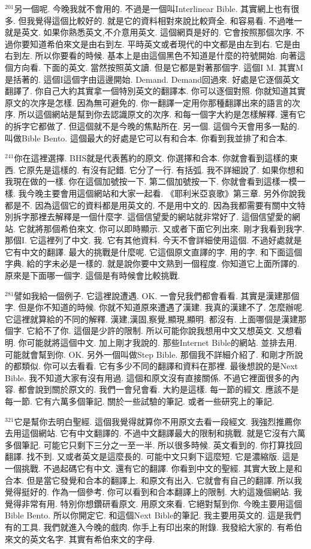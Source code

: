 \documentclass{book}
\begin{document}
$^{201}$另一個呢.
今晚我就不會用的.
不過是一個叫Interlinear Bible.
其實網上也有很多.
但我覺得這個比較好的.
就是它的資料相對來說比較齊全.
和容易看.
不過唯一就是英文.
如果你熟悉英文,不介意用英文.
這個網頁是好的.
它會按照那個次序.
不過你要知道希伯來文是由右到左.
平時英文或者現代的中文都是由左到右.
它是由右到左.
所以你要看的時候.
基本上是由這個黑色不知道是什麼的符號開始.
向著這個方向看.
下面的英文.
當然按照英文讀.
但是它都是對著那個字.
這個I M.
其實M是括著的.
這個I這個字由這邊開始.
Demand.
Demand回過來.
好處是它逐個英文翻譯了.
你自己大約其實拿一個特別英文的翻譯本.
你可以逐個對照.
你就知道其實原文的次序是怎樣.
因為無可避免的.
你一翻譯一定用你那種翻譯出來的語言的次序.
所以這個網站是幫到你去認識原文的次序.
和每一個字大約是怎樣解釋.
還有它的拆字它都做了.
但這個就不是今晚的焦點所在.
另一個.
這個今天會用多一點的.
叫做Bible Bento.
這個最大的好處是它可以有和合本.
你看到我並排了和合本.

$^{241}$你在這裡選擇.
BHS就是代表舊約的原文.
你選擇和合本.
你就會看到這樣的東西.
它原先是這樣的.
有沒有記錯.
它分了一行.
有括弧.
我不詳細說了.
如果你想和我現在做的一樣.
你在這個加號按一下.
第二個加號按一下.
你就會看到這樣一模一樣.
我今晚主要會用這個網站和大家一起看.
《耶利米亞哀歌》第三章.
另外你說我都是不.
因為這個它的資料都是用英文的.
不是用中文的.
因為我都需要有關中文特別拆字那裡去解釋是一個什麼字.
這個信望愛的網站就非常好了.
這個信望愛的網站.
它就將那個希伯來文.
你可以即時顯示.
又或者下面它列出來.
剛才我看到我字.
那個I.
它這裡列了中文.
我.
它有其他資料.
今天不會詳細使用這個.
不過好處就是它有中文的翻譯.
最大的挑戰是什麼呢.
它這個原文直譯的字.
用的字.
和下面這個字典.
給的字未必是一樣的.
就是說你要中文熟到一個程度.
你知道它上面所譯的.
原來是下面哪一個字.
這個是有時候會比較挑戰.

$^{281}$譬如我給一個例子.
它這裡說遭遇.
OK.
一會兒我們都會看看.
其實是漢建那個字.
但是你不知道的時候.
你就不知道原來遭遇了漢建.
我真的漢建不了.
怎麼辦呢.
它這裡就算給的不同的解釋.
漢建,漢固,察覺,顯現,顯明.
都沒有.
上面哪個是漢建那個字.
它給不了你.
這個是少許的限制.
所以可能你說我想用中文又想英文.
又想看明.
你可能就將這個中文.
加上剛才我說的.
那些Internet Bible的網站.
並排去用.
可能就會幫到你.
OK.
另外一個叫做Step Bible.
那個我不詳細介紹了.
和剛才所說的都類似.
你可以去看看.
它有多少不同的翻譯和資料在那裡.
最後想說的是Next Bible.
我不知道大家有沒有用過.
這個和原文沒有直接關係.
不過它裡面很多的內容.
都會說到關於原文的.
我們一會兒會看.
大約是這樣.
每一節的經文.
應該不是每一節.
它有六萬多個筆記.
關於一些試驗的筆記.
或者一些研究上的筆記.

$^{321}$它是幫你去明白聖經.
這個我覺得就算你不用原文去看一段經文.
我強烈推薦你去用這個網站.
它有中文翻譯的.
不過中文翻譯最大的限制和挑戰.
就是它沒有六萬多個筆記.
可能它只剩下三分之一至一半.
所以很多時候.
英文看到的.
你打算找回翻譯.
找不到.
又或者英文是這麼長的.
可能中文只剩下這麼短.
它是濃縮版.
這是一個挑戰.
不過起碼它有中文.
還有它的翻譯.
你看到中文的聖經.
其實大致上是和合本.
但是當它發覺和合本的翻譯上.
和原文有出入.
它就會有自己的翻譯.
所以我覺得挺好的.
作為一個參考.
你可以看到和合本翻譯上的限制.
大約這幾個網站.
我覺得非常有用.
特別你想鑽研看原文.
用原文來看.
它絕對幫到你.
今晚主要用這個Bible Bento.
所以你開定它.
和這個Next Bible的筆記.
我主要用英文的.
這是我們有的工具.
我們就進入今晚的戲肉.
你手上有印出來的附錄.
我發給大家的.
有希伯來文的英文名字.
其實有希伯來文的字母.
\end{document}
